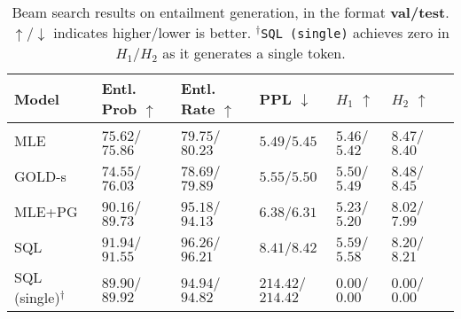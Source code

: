 \begin{table*}
\centering
\small
\begin{tabular}{l|llllll}
\toprule
\textbf{Model} & \textbf{Entl. Prob $\uparrow$} & \textbf{Entl. Rate $\uparrow$} & \textbf{PPL  $\downarrow$} & \textbf{$H_1$ $\uparrow$} & \textbf{$H_2$ $\uparrow$} \\
\midrule
MLE    & $75.62$/$75.86$ & $79.75$/$80.23$ & $5.49$/$5.45$  & $5.46$/$5.42$ & $8.47$/$8.40$ \\
GOLD-s~\citep{pang2021text} & $74.55$/$76.03$ & $78.69$/$79.89$ & $5.55$/$5.50$  & $5.50$/$5.49$ & $8.48$/$8.45$ \\
MLE+PG & $90.16$/$89.73$ & $95.18$/$94.13$ & $6.38$/$6.31$ & $5.23$/$5.20$ & $8.02$/$7.99$ \\
SQL    & $91.94$/$91.55$ & $96.26$/$96.21$ & $8.41$/$8.42$ & $5.59$/$5.58$ & $8.20$/$8.21$ \\
SQL (single)$^\dagger$ & $89.90$/$89.92$ & $94.94$/$94.82$ & $214.42$/$214.42$ & $0.00$/$0.00$ & $0.00$/$0.00$ \\
\bottomrule
\end{tabular}
\caption{Beam search results on entailment generation, in the format \textbf{val/test}. $\uparrow$/$\downarrow$ indicates higher/lower is better. $^\dagger$\texttt{SQL (single)} achieves zero in $H_1$/$H_2$ as it generates a single token.
}
\label{table:entailment-generation}
\end{table*}
